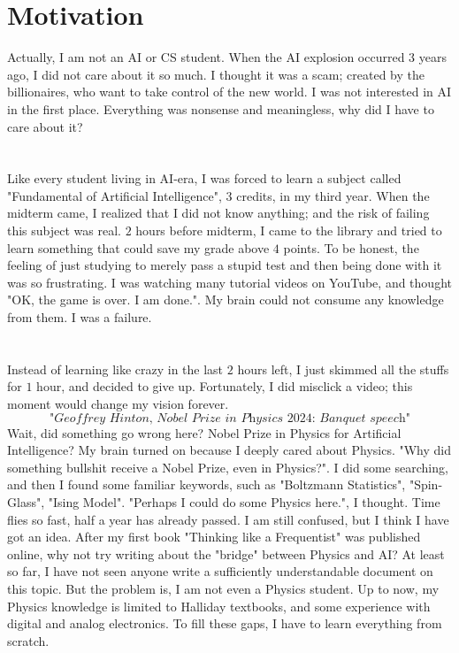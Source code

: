 \documentclass[phyai.tex]{subfiles}
\begin{document}
\chapter{Motivation}\label{chap:motivation} %
\indent Actually, I am not an AI or CS student. When the AI explosion occurred $3$ years ago, I did not care about it so much. I thought it was a scam; created by the billionaires, who want to take control of the new world. I was not interested in AI in the first place.  Everything was nonsense and meaningless, why did I have to care about it?
\\ \\ \\ \indent Like every student living in AI-era, I was forced to learn a subject called "Fundamental of Artificial Intelligence", $3$ credits, in my third year. When the midterm came, I realized that I did not know anything; and the risk of failing this subject was real. $2$ hours before midterm, I came to the library and tried to learn something that could save my grade above $4$ points. To be honest, the feeling of just studying to merely pass a stupid test and then being done with it was so frustrating. I was watching many tutorial videos on YouTube, and thought "OK, the game is over. I am done.". My brain could not consume any knowledge from them. I was a failure.
\\ \\ \\ \indent Instead of learning like crazy in the last $2$ hours left, I just skimmed all the stuffs for $1$ hour, and decided to give up. Fortunately, I did misclick a video; this moment would change my vision forever.
$$\textit{"Geoffrey Hinton, Nobel Prize in Physics 2024: Banquet speech"}$$
Wait, did something go wrong here? Nobel Prize in Physics for Artificial Intelligence? My brain turned on because I deeply cared about Physics. "Why did something bullshit receive a Nobel Prize, even in Physics?". I did some searching, and then I found some familiar keywords, such as "Boltzmann Statistics", "Spin-Glass", "Ising Model". "Perhaps I could do some Physics here.", I thought. Time flies so fast, half a year has already passed. I am still confused, but I think I have got an idea. After my first book "Thinking like a Frequentist" was published online, why not try writing about the "bridge" between Physics and AI? At least so far, I have not seen anyone write a sufficiently understandable document on this topic. But the problem is, I am not even a Physics student. Up to now, my Physics knowledge is limited to Halliday textbooks, and some experience with digital and analog electronics. To fill these gaps, I have to learn everything from scratch.
\end{document}
